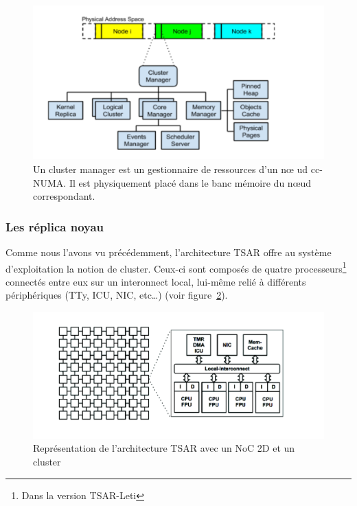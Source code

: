       \begin{figure}[!h]
        \centering \includegraphics[scale=0.16]{include/img/cluster_manager}
        \caption{Un cluster manager est un gestionnaire de ressources d'un n\oe
          ud cc-NUMA. Il est physiquement placé dans le banc mémoire du n\oe ud
          correspondant.}
        \label{fig:cluster_manager}
      \end{figure}

      
    \subsubsection{Les réplica noyau}

      Comme nous l'avons vu précédemment, l'architecture TSAR offre au système
      d'exploitation la notion de cluster. Ceux-ci sont composés de quatre
      processeurs\footnote{Dans la version TSAR-Leti} connectés entre eux sur un
      interonnect local, lui-même relié à différents périphériques (TTy, ICU,
      NIC, etc\ldots) (voir figure~\ref{fig:tsar_cluster}).
      
      \begin{figure}[!h]
        \centering \includegraphics[scale=0.17]{include/img/tsar_clusters.png}
        \caption{Représentation de l'architecture TSAR avec un NoC 2D et un
          cluster~\cite{almaless2014universite}}
        \label{fig:tsar_cluster}

      \end{figure}

